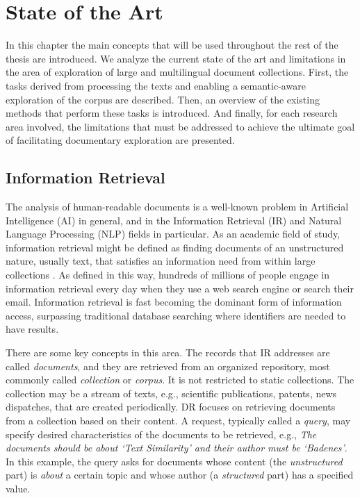 

\chapter{State of the Art}\label{ch:soa}

\graphicspath{{soa/figures/}}


In this chapter the main concepts that will be used throughout the rest of the thesis are introduced. 
We analyze the current state of the art and limitations in the area of exploration of large and multilingual document collections. First, the tasks derived from processing the texts and enabling a semantic-aware exploration of the corpus are described. Then, an overview of the existing methods that perform these tasks is introduced. And finally, for each research area involved, the limitations that must be addressed to achieve the ultimate goal of facilitating documentary exploration are presented. 

\section{Information Retrieval}

The analysis of human-readable documents is a well-known problem in Artificial Intelligence (AI) in general, and in the Information Retrieval (IR) and Natural Language Processing (NLP) fields in particular. As an academic field of study, information retrieval might be defined as finding documents of an unstructured nature, usually text, that satisfies an information need from within large collections \citep{manning2008}. As defined in this way, hundreds of millions of people engage in information retrieval every day when they use a web search engine or search their email. Information retrieval is fast becoming the dominant form of information access, surpassing traditional database searching where identifiers are needed to have results. 

There are some key concepts in this area.  The  records  that  IR  addresses  are  called \textit{documents}, and they are retrieved from an organized repository, most commonly called  \textit{collection} or \textit{corpus}. It is not restricted to static collections. The collection may be a stream of texts, e.g., scientific publications, patents, news dispatches, that are created periodically. DR focuses on retrieving documents from a collection based on their content. A request, typically called a \textit{query},  may specify desired characteristics of the documents to be retrieved, e.g., \textit{The documents should be about ‘Text Similarity’ and their author must be ‘Badenes’}. In this example, the query asks for documents whose content (the \textit{unstructured} part) is \textit{about} a certain topic and whose author (a \textit{structured} part) has a specified value. 

